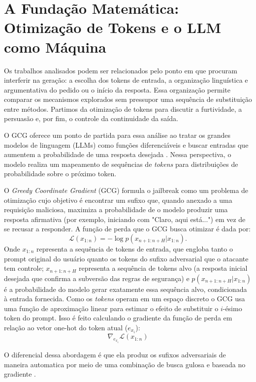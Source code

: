 \section{A Fundação Matemática: Otimização de Tokens e o LLM como Máquina}
\label{sec:jonatas}
Os trabalhos analisados podem ser relacionados pelo ponto em que procuram interferir na geração: a escolha dos tokens de entrada, a organização linguística e argumentativa do pedido ou o início da resposta. Essa organização permite comparar os mecanismos explorados sem pressupor uma sequência de substituição entre métodos. Partimos da otimização de tokens para discutir a furtividade, a persuasão e, por fim, o controle da continuidade da saída.

O GCG oferece um ponto de partida para essa análise ao tratar os grandes modelos de linguagem (LLMs) como funções diferenciáveis e buscar entradas que aumentem a probabilidade de uma resposta desejada \cite{zou2023universaltransferableadversarialattacks}. Nessa perspectiva, o modelo realiza um mapeamento de sequências de \textit{tokens} para distribuições de probabilidade sobre o próximo token.

O \textit{Greedy Coordinate Gradient } (GCG) formula o jailbreak como um problema de otimização 
cujo objetivo é encontrar um sufixo que, quando anexado a uma requisição maliciosa, maximiza 
a probabilidade de o modelo produzir uma resposta afirmativa (por exemplo, iniciando com 
"Claro, aqui está...") em vez de se recusar a responder. A função de perda que o GCG busca 
otimizar é dada por: $$\mathcal{L}(x_{1:n}) = -\log p(x_{n+1:n+H} \vert{} x_{1:n}).$$ Onde $x_{1:n}$ 
representa a sequência de tokens de entrada, que engloba tanto o prompt original do usuário 
quanto os tokens do sufixo adversarial que o atacante tem controle; $x_{n+1:n+H}$ representa 
a sequência de tokens alvo (a resposta inicial desejada que confirma a subversão das regras 
de segurança) e $p(x_{n+1:n+H} \vert{} x_{1:n})$ é a probabilidade do modelo gerar exatamente 
essa sequência alvo, condicionada à entrada fornecida. Como os \textit{tokens} 
operam em um espaço discreto o GCG usa uma função de aproximação linear para estimar 
o efeito de substituir o $i$-ésimo token do prompt. Isso é feito calculando o gradiente 
da função de perda em relação ao vetor one-hot do token atual 
($e_{x_i}$): $$\nabla_{e_{x_i}}\mathcal{L}(x_{1:n})$$

O diferencial dessa abordagem é que ela produz os sufixos adversariais de maneira 
automatica por meio de uma combinação de busca gulosa e baseada no gradiente 
\cite{zou2023universaltransferableadversarialattacks}.

